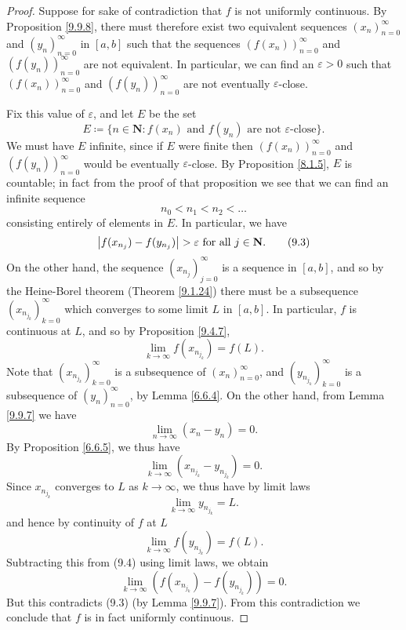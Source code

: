 \begin{proof}
    Suppose for sake of contradiction that \(f\) is not uniformly continuous.
    By Proposition \ref{9.9.8}, there must therefore exist two equivalent sequences \((x_n)_{n = 0}^\infty\) and \((y_n)_{n = 0}^\infty\) in \([a, b]\) such that the sequences \((f(x_n))_{n = 0}^\infty\) and \((f(y_n))_{n = 0}^\infty\) are not equivalent.
    In particular, we can find an \(\varepsilon > 0\) such that \((f(x_n))_{n = 0}^\infty\) and \((f(y_n))_{n = 0}^\infty\) are not eventually \(\varepsilon\)-close.

    Fix this value of \(\varepsilon\), and let \(E\) be the set
    \[
        E \coloneqq \{n \in \mathbf{N} : f(x_n) \text{ and } f(y_n) \text{ are not \(\varepsilon\)-close}\}.
    \]
    We must have \(E\) infinite, since if \(E\) were finite then \((f(x_n))_{n = 0}^\infty\) and \((f(y_n))_{n = 0}^\infty\) would be eventually \(\varepsilon\)-close.
    By Proposition \ref{8.1.5}, \(E\) is countable;
    in fact from the proof of that proposition we see that we can find an infinite sequence
    \[
        n_0 < n_1 < n_2 < \dots
    \]
    consisting entirely of elements in \(E\).
    In particular, we have
    \[
        \abs*{f(x_{n_j}) - f(y_{n_j})} > \varepsilon \text{ for all } j \in \mathbf{N}. \tag{9.3}\label{eq 9.3}
    \]
    On the other hand, the sequence \((x_{n_j})_{j = 0}^\infty\) is a sequence in \([a, b]\), and so by the Heine-Borel theorem (Theorem \ref{9.1.24}) there must be a subsequence \((x_{n_{j_k}})_{k = 0}^\infty\) which converges to some limit \(L\) in \([a, b]\).
    In particular, \(f\) is continuous at \(L\), and so by Proposition \ref{9.4.7},
    \[
        \lim_{k \to \infty} f(x_{n_{j_k}}) = f(L). \tag{9.4}\label{eq 9.4}
    \]
    Note that \((x_{n_{j_k}})_{k = 0}^\infty\) is a subsequence of \((x_n)_{n = 0}^\infty\), and \((y_{n_{j_k}})_{k = 0}^\infty\) is a subsequence of \((y_n)_{n = 0}^\infty\), by Lemma \ref{6.6.4}.
    On the other hand, from Lemma \ref{9.9.7} we have
    \[
        \lim_{n \to \infty} (x_n - y_n) = 0.
    \]
    By Proposition \ref{6.6.5}, we thus have
    \[
        \lim_{k \to \infty} (x_{n_{j_k}} - y_{n_{j_k}}) = 0.
    \]
    Since \(x_{n_{j_k}}\) converges to \(L\) as \(k \to \infty\), we thus have by limit laws
    \[
        \lim_{k \to \infty} y_{n_{j_k}} = L.
    \]
    and hence by continuity of \(f\) at \(L\)
    \[
        \lim_{k \to \infty} f(y_{n_{j_k}}) = f(L).
    \]
    Subtracting this from (9.4) using limit laws, we obtain
    \[
        \lim_{k \to \infty} (f(x_{n_{j_k}}) - f(y_{n_{j_k}})) = 0.
    \]
    But this contradicts (9.3) (by Lemma \ref{9.9.7}).
    From this contradiction we conclude that \(f\) is in fact uniformly continuous.
\end{proof}
